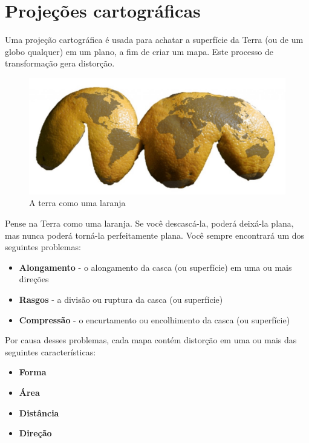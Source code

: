 \documentclass[
]{krantz}
\providecommand{\tightlist}{%
  \setlength{\itemsep}{0pt}\setlength{\parskip}{0pt}}
\begin{document}
\hypertarget{projeuxe7uxf5es-cartogruxe1ficas}{%
\section{Projeções cartográficas}\label{projeuxe7uxf5es-cartogruxe1ficas}}

Uma projeção cartográfica é usada para achatar a superfície da Terra (ou de um globo qualquer) em um plano, a fim de criar um mapa. Este processo de transformação gera distorção.

\begin{figure}
\centering
\includegraphics{media/modulo0/dalandan.png}
\caption{A terra como uma laranja}
\end{figure}

Pense na Terra como uma laranja. Se você descascá-la, poderá deixá-la plana, mas nunca poderá torná-la perfeitamente plana. Você sempre encontrará um dos seguintes problemas:

\begin{itemize}
\tightlist
\item
  \textbf{Alongamento} - o alongamento da casca (ou superfície) em uma ou mais direções
\item
  \textbf{Rasgos} - a divisão ou ruptura da casca (ou superfície)
\item
  \textbf{Compressão} - o encurtamento ou encolhimento da casca (ou superfície)
\end{itemize}

Por causa desses problemas, cada mapa contém distorção em uma ou mais das seguintes características:

\begin{itemize}
\tightlist
\item
  \textbf{Forma}
\item
  \textbf{Área}
\item
  \textbf{Distância}
\item
  \textbf{Direção}
\end{itemize}
\end{document}
